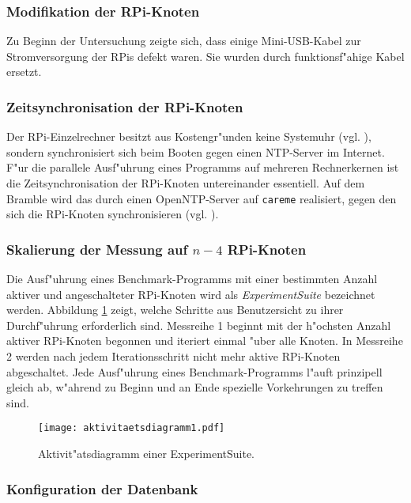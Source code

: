 {\subsubsection{Modifikation der RPi-Knoten}

Zu Beginn der Untersuchung zeigte sich, dass einige Mini-USB-Kabel zur Stromversorgung der RPis defekt waren. Sie wurden durch funktionsf"ahige Kabel ersetzt. 

\subsubsection{Zeitsynchronisation der RPi-Knoten} 

Der RPi-Einzelrechner besitzt aus Kostengr"unden keine Systemuhr (vgl. \cite{schmi13}), sondern synchronisiert sich beim Booten gegen einen NTP-Server im Internet. F"ur die parallele Ausf"uhrung eines Programms auf mehreren Rechnerkernen ist die Zeitsynchronisation der RPi-Knoten untereinander essentiell. Auf dem Bramble wird das durch einen OpenNTP-Server auf \texttt{careme} realisiert, gegen den sich die RPi-Knoten synchronisieren (vgl. \cite{kli13}). 

\subsubsection{Skalierung der Messung auf $n-4$ RPi-Knoten} 

Die Ausf"uhrung eines Benchmark-Programms mit einer bestimmten Anzahl aktiver und angeschalteter RPi-Knoten wird als \textit{ExperimentSuite} bezeichnet werden. Abbildung \ref{fig:Aktivitaetsdiagramm} zeigt, welche Schritte aus Benutzersicht zu ihrer Durchf"uhrung erforderlich sind. Messreihe 1 beginnt mit der h"ochsten Anzahl aktiver RPi-Knoten begonnen und iteriert einmal "uber alle Knoten. In Messreihe 2 werden nach jedem Iterationsschritt nicht mehr aktive RPi-Knoten abgeschaltet. Jede Ausf"uhrung eines Benchmark-Programms l"auft prinzipell gleich ab, w"ahrend zu Beginn und an Ende spezielle Vorkehrungen zu treffen sind.  
\begin{figure}[htb]
  \centerline{\texttt{[image: aktivitaetsdiagramm1.pdf]}} 
  \caption{Aktivit"atsdiagramm einer ExperimentSuite.}
  \label{fig:Aktivitaetsdiagramm}
\end{figure}

\subsubsection{Konfiguration der Datenbank}

}
